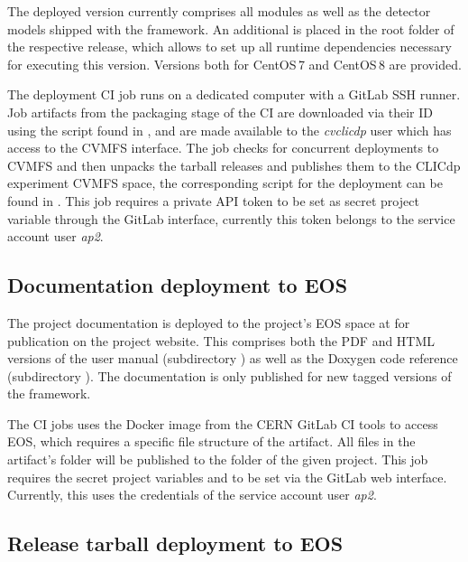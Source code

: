 The deployed version currently comprises all modules as well as the detector models shipped with the framework.
An additional  is placed in the root folder of the respective release, which allows to set up all runtime dependencies necessary for executing this version.
Versions both for CentOS\,7 and CentOS\,8 are provided.

The deployment CI job runs on a dedicated computer with a GitLab SSH runner.
Job artifacts from the packaging stage of the CI are downloaded via their ID using the script found in , and are made available to the \emph{cvclicdp} user which has access to the CVMFS interface.
The job checks for concurrent deployments to CVMFS and then unpacks the tarball releases and publishes them to the CLICdp experiment CVMFS space, the corresponding script for the deployment can be found in .
This job requires a private API token to be set as secret project variable through the GitLab interface, currently this token belongs to the service account user \emph{ap2}.

\subsection{Documentation deployment to EOS}

The project documentation is deployed to the project's EOS space at  for publication on the project website.
This comprises both the PDF and HTML versions of the user manual (subdirectory ) as well as the Doxygen code reference (subdirectory ).
The documentation is only published for new tagged versions of the framework.

The CI jobs uses the  Docker image from the CERN GitLab CI tools to access EOS, which requires a specific file structure of the artifact.
All files in the artifact's  folder will be published to the  folder of the given project.
This job requires the secret project variables  and  to be set via the GitLab web interface.
Currently, this uses the credentials of the service account user \emph{ap2}.

\subsection{Release tarball deployment to EOS}


